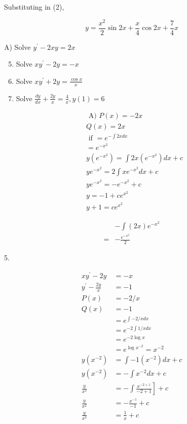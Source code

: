 \documentclass[10pt]{article}
\begin{document}
Substituting in (2),

$$
y=\frac{x^{2}}{2} \sin 2 x+\frac{x}{4} \cos 2 x+\frac{7}{4} x
$$

A) Solve $y^{\prime}-2 x y=2 x$

\begin{enumerate}
  \setcounter{enumi}{4}
  \item Solve $x y^{\prime}-2 y=-x$

  \item Solve $x y^{\prime}+2 y=\frac{\cos x}{x}$

  \item Solve $\frac{d y}{d x}+\frac{2 y}{x}=\frac{4}{x}, y(1)=6$

\end{enumerate}

$$
\begin{aligned}
& \text { A) } P(x)=-2 x \\
& Q(x)=2 x \\
& \text { if }=e^{-\int 2 x d x} \\
& =e^{-x^{2}} \\
& y\left(e^{-x^{2}}\right)=\int 2 x\left(e^{-x^{2}}\right) d x+c \\
& y e^{-x^{2}}=2 \int x e^{-x^{2}} d x+c \\
& y e^{-x^{2}}=-e^{-x^{2}}+c \\
& y=-1+c e^{x^{2}} \\
& y+1=c e^{x^{2}}
\end{aligned}
$$

$$
\begin{aligned}
& -\int(2 x) e^{-x^{2}} \\
= & -\frac{e^{-x^{2}}}{2}
\end{aligned}
$$

5.

$$
\begin{aligned}
x y^{\prime}-2 y & =-x \\
y^{\prime}-\frac{2 y}{x} & =-1 \\
P(x) & =-2 / x \\
Q(x) & =-1 \\
& =e^{\int-2 / x d x} \\
& =e^{-2 \int 1 / x d x} \\
& =e^{-2 \log x} \\
& =e^{\log x^{-2}}=x^{-2} \\
y\left(x^{-2}\right) & =\int-1\left(x^{-2}\right) d x+c \\
y\left(x^{-2}\right) & =-\int x^{-2} d x+c \\
\frac{y}{x^{2}} & \left.=-\int \frac{x^{-2+1}}{-2+1}\right]+c \\
\frac{y}{x^{2}} & =-\frac{x^{-1}}{-1}+c \\
\frac{y}{x^{2}} & =\frac{1}{x}+c
\end{aligned}
$$
\end{document}
